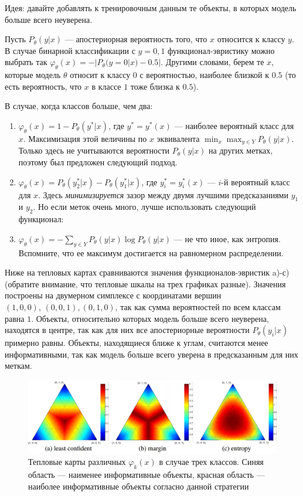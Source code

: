 \documentclass[specialist, 12pt, href]{article}
\begin{document}
Идея: давайте добавлять к тренировочным данным те объекты, в которых
модель больше всего неуверена.

Пусть \(P_{\theta}(y|x)\) --- апостериорная вероятность того, что \(x\)
относится к классу \(y\). В случае бинарной классификации с \(y = 0, 1\)
функционал-эвристику можно выбрать так
\(\varphi_{\theta}(x) = -|P_{\theta}(y = 0|x) - 0.5|\). Другими словами,
берем те \(x\), которые модель \(\theta\) относит к классу \(0\) с
вероятностью, наиболее близкой к \(0.5\) (то есть вероятность, что \(x\)
в классе \(1\) тоже близка к \(0.5\)).

В случае, когда классов больше, чем два:

\begin{enumerate}
\def\labelenumi{\alph{enumi})}
\item
  \(\varphi_{\theta}(x) = 1 - P_{\theta}(y^*|x)\), где \(y^* = y^*(x)\)
  --- наиболее вероятный класс для \(x\). Максимизация этой величины по
  \(x\) эквивалента \(\min_x\max_{y\in Y} P_{\theta}(y|x)\). Только
  здесь не учитываются вероятности \(P_{\theta}(y|x)\) на других метках,
  поэтому был предложен следующий подход.
\item
  \(\varphi_{\theta}(x) = P_{\theta}(y^*_2|x) - P_{\theta}(y^*_1|x)\),
  где \(y^*_i = y^*_i(x)\) --- \(i\)-й вероятный класс для \(x\). Здесь
  \emph{минимизируется} зазор между двумя лучшими предсказаниями \(y_1\)
  и \(y_2\). Но если меток очень много, лучше использовать следующий
  функционал:
\item
  \(\varphi_{\theta}(x) = - \sum_{y \in Y} P_{\theta}(y|x) \log P_{\theta}(y|x)\)
  --- не что иное, как энтропия. Вспомните, что ее максимум достигается
  на равномерном распределении.
\end{enumerate}

Ниже на тепловых картах сравниваются значения функционалов-эвристик
a)-с) (обратите внимание, что тепловые шкалы на трех графиках разные). Значения построены на двумерном симплексе с координатами вершин \((1, 0, 0),\, (0, 0, 1), (0, 1, 0)\), так как сумма вероятностей по всем классам равна \(1\).
Объекты, относительно которых модель больше всего неуверена, находятся в
центре, так как для них все апостериорные вероятности
\(P_{\theta}(y_i|x)\) примерно равны. Объекты, находящиеся ближе к
углам, считаются менее информативными, так как модель больше всего
уверена в предсказанным для них меткам.

\begin{figure}[htbp]
\centering
\includegraphics[width=6in]{img/hm.jpg}
\caption{Тепловые карты различных \(\varphi_k(x)\) в случае трех
классов. Синяя область --- наименее информативные объекты, красная
область --- наиболее информативные объекты согласно данной стратегии}
\end{figure}
\end{document}
